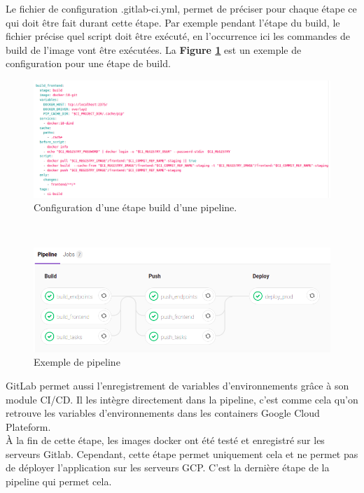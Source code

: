 \documentclass{article} %
\begin{document}
{Le fichier de configuration .gitlab-ci.yml, permet de préciser pour chaque étape ce qui doit être fait durant cette étape. Par exemple pendant l'étape du build, le fichier précise quel script doit être exécuté, en l'occurrence ici les commandes de build de l'image vont être exécutées. La \textbf{Figure \ref{fig:gitlab-ci}} est un exemple de configuration pour une étape de build.

\begin{figure}[!h]
 \centering
 \includegraphics[keepaspectratio = true,scale=0.4]{gitlab.png}
 \caption{Configuration d'une étape build d'une pipeline.}
 \label{fig:gitlab-ci}
\end{figure}
~\\
\begin{figure}[!h]
 \centering
 \includegraphics[keepaspectratio = true,scale=0.4]{pipeline.png}
 \caption{Exemple de pipeline}
 \label{fig:pipeline}
\end{figure}

GitLab permet aussi l'enregistrement de variables d'environnements grâce à son module CI/CD. Il les intègre directement dans la pipeline, c'est comme cela qu'on retrouve les variables d'environnements dans les containers Google Cloud Plateform.\\

À la fin de cette étape, les images docker ont été testé et enregistré sur les serveurs Gitlab. Cependant, cette étape permet uniquement cela et ne permet pas de déployer l'application sur les serveurs GCP. C'est la dernière étape de la pipeline qui permet cela.

}
\end{document}
